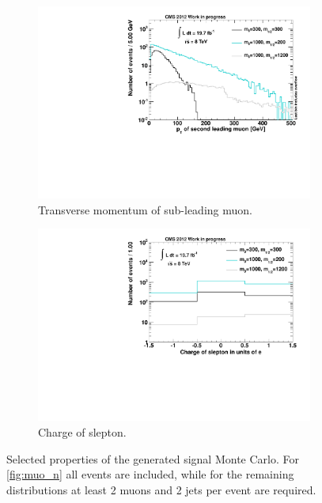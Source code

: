 \begin{figure}[!htbp]
  \ContinuedFloat
  \centering
  \begin{subfigure}[b]{0.495\textwidth}
    \centering
    \includegraphics[width=\textwidth]{plots/sig_muo_pt2.pdf}
    \caption{Transverse momentum of sub-leading muon.\label{fig:sig_muo_pt2}}
  \end{subfigure}
  \begin{subfigure}[b]{0.495\textwidth}
    \centering
    \includegraphics[width=\textwidth]{plots/sig_slepton_charge.pdf}
    \caption{Charge of slepton.\label{fig:sig_slepton_charge}}
  \end{subfigure}
  \caption{Selected properties of the generated signal Monte Carlo. For \ref{fig:muo_n} all events are included, while for the remaining distributions at least 2 muons and 2 jets per event are required.}
  \label{fig:signal_properties}
\end{figure}



